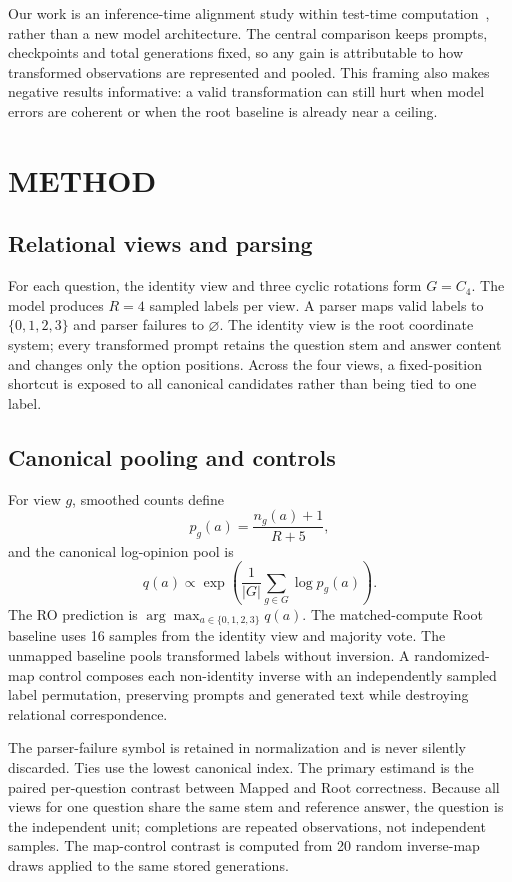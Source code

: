 \documentclass{article}
\begin{document}
Our work is an inference-time alignment study within test-time computation~\cite{snell2025scaling}, rather than a new model architecture. The central comparison keeps prompts, checkpoints and total generations fixed, so any gain is attributable to how transformed observations are represented and pooled. This framing also makes negative results informative: a valid transformation can still hurt when model errors are coherent or when the root baseline is already near a ceiling.

\section{METHOD}
\subsection{Relational views and parsing}
For each question, the identity view and three cyclic rotations form $G=C_4$. The model produces $R=4$ sampled labels per view. A parser maps valid labels to $\{0,1,2,3\}$ and parser failures to $\varnothing$. The identity view is the root coordinate system; every transformed prompt retains the question stem and answer content and changes only the option positions. Across the four views, a fixed-position shortcut is exposed to all canonical candidates rather than being tied to one label.

\subsection{Canonical pooling and controls}
For view $g$, smoothed counts define
\begin{equation}
 p_g(a)=\frac{n_g(a)+1}{R+5},
\end{equation}
and the canonical log-opinion pool is
\begin{equation}
 q(a)\propto\exp\left(\frac{1}{|G|}\sum_{g\in G}\log p_g(a)\right).
\end{equation}
The RO prediction is $\arg\max_{a\in\{0,1,2,3\}}q(a)$. The matched-compute Root baseline uses 16 samples from the identity view and majority vote. The unmapped baseline pools transformed labels without inversion. A randomized-map control composes each non-identity inverse with an independently sampled label permutation, preserving prompts and generated text while destroying relational correspondence.

The parser-failure symbol is retained in normalization and is never silently discarded. Ties use the lowest canonical index. The primary estimand is the paired per-question contrast between Mapped and Root correctness. Because all views for one question share the same stem and reference answer, the question is the independent unit; completions are repeated observations, not independent samples. The map-control contrast is computed from 20 random inverse-map draws applied to the same stored generations.
\end{document}
